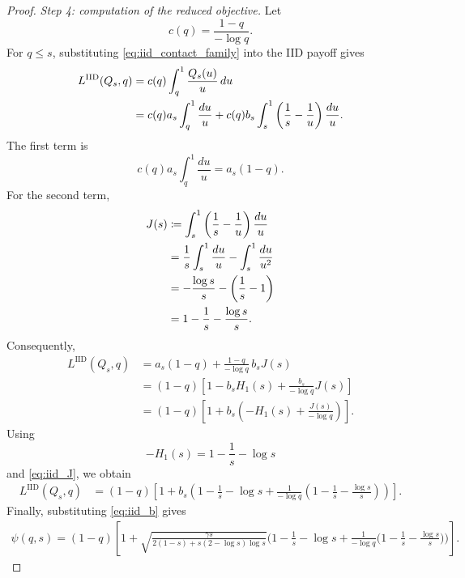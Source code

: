 \documentclass[10pt,a4paper]{amsart}
\newcommand{\LIID}{L^{\mathrm{IID}}}
\newcommand{\comp}{\gamma}
\begin{document}
\begin{proof}
\medskip

\noindent\emph{Step 4: computation of the reduced objective.}
Let
\begin{equation*}
    c(q)=\frac{1-q}{-\log q}.
\end{equation*}
For $q\leq s$, substituting \eqref{eq:iid_contact_family} into the
IID payoff gives
\begin{align}
    \LIID(Q_s,q)
    &=
    c(q)\int_q^1\frac{Q_s(u)}u\,du\notag\\
    &=
    c(q)a_s\int_q^1\frac{du}{u}
    +
    c(q)b_s
    \int_s^1
    \left(
        \frac1s-\frac1u
    \right)
    \frac{du}{u}.
    \label{eq:iid_objective_split}
\end{align}
The first term is
\begin{equation*}
    c(q)a_s\int_q^1\frac{du}{u}
    =
    a_s(1-q).
\end{equation*}
For the second term,
\begin{align}
    J(s)
    &\coloneqq
    \int_s^1
    \left(
        \frac1s-\frac1u
    \right)
    \frac{du}{u}\notag\\
    &=
    \frac1s\int_s^1\frac{du}{u}
    -
    \int_s^1\frac{du}{u^2}\notag\\
    &=
    -\frac{\log s}{s}
    -
    \left(
        \frac1s-1
    \right)\notag\\
    &=
    1-\frac1s-\frac{\log s}{s}.
    \label{eq:iid_J}
\end{align}
Consequently,
\begin{align*}
    \LIID(Q_s,q)
    &=
    a_s(1-q)
    +
    \frac{1-q}{-\log q}\,b_sJ(s)\\
    &=
    (1-q)
    \left[
        1-b_sH_1(s)
        +
        \frac{b_s}{-\log q}J(s)
    \right]\\
    &=
    (1-q)
    \left[
        1+
        b_s
        \left(
            -H_1(s)
            +
            \frac{J(s)}{-\log q}
        \right)
    \right].
\end{align*}
Using
\begin{equation*}
    -H_1(s)
    =
    1-\frac1s-\log s
\end{equation*}
and \eqref{eq:iid_J}, we obtain
\begin{align}
    \LIID(Q_s,q)
    &=
    (1-q)
    \left[
        1+
        b_s
        \left(
            1-\frac1s-\log s
            +
            \frac1{-\log q}
            \left(
                1-\frac1s-\frac{\log s}{s}
            \right)
        \right)
    \right].
    \label{eq:iid_reduced_before_b}
\end{align}
Finally, substituting \eqref{eq:iid_b} gives
\begin{align}
    \psi(q,s) \!
    = \!
    (1-q)\! \!
    \left[
        1+
        \sqrt{
            \frac{\comp s}{
                2(1-s)+s(2-\log s)\log s
            }
        }
        \bigg(\!
            1-\frac1s-\log s
            +
            \frac1{-\log q}
            \big(
                1-\frac1s-\frac{\log s}{s}
            \big)\!
        \bigg)
    \!\right] \!.
    \label{eq:iid_psi_derived}
\end{align}


\end{proof}
\end{document}
